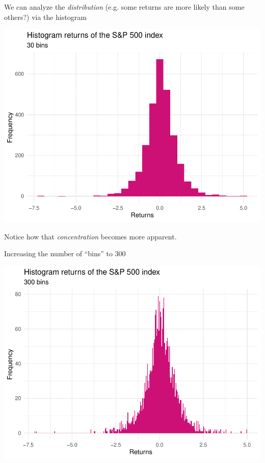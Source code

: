 \documentclass[notes=show,smaller,handout]{beamer}\usepackage[]{graphicx}\usepackage[]{color}
\newenvironment{knitrout}{}{} %
\begin{document}
\begin{frame}{\secname}
  \begin{example}[continued]

  We can analyze the \emph{distribution} (e.g. some returns are more likely than some others?) via the histogram

\begin{knitrout}
\color{fgcolor}

{\centering \includegraphics[width=0.5\linewidth]{figure/unnamed-chunk-4-1} 

}



\end{knitrout}

Notice how that \emph{concentration} becomes more apparent.

  \end{example}
\end{frame}


\begin{frame}{\secname}
  \begin{example}[continued]
  Increasing the number of ``bins'' to 300

\begin{knitrout}
\color{fgcolor}

{\centering \includegraphics[width=0.5\linewidth]{figure/unnamed-chunk-5-1} 

}



\end{knitrout}
  \end{example}
\end{frame}
\end{document}

